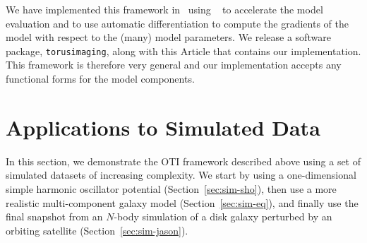 We have implemented this framework in \python\ using \jax\ \citep{jax:2018} to
accelerate the model evaluation and to use automatic differentiation to compute the
gradients of the model with respect to the (many) model parameters.
We release a software package, \texttt{torusimaging}, along with this Article that
contains our implementation.
This framework is therefore very general and our implementation accepts any functional
forms for the model components.




\section{Applications to Simulated Data} \label{sec:applications-sim}

In this section, we demonstrate the OTI framework described above using a set of
simulated datasets of increasing complexity.
We start by using a one-dimensional simple harmonic oscillator potential
(Section~\ref{sec:sim-sho}), then use a more realistic multi-component galaxy model
(Section~\ref{sec:sim-eq}), and finally use the final snapshot from an $N$-body
simulation of a disk galaxy perturbed by an orbiting satellite
(Section~\ref{sec:sim-jason}).


